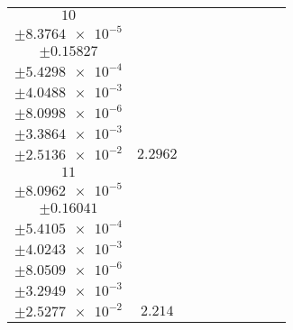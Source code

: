 \documentclass[8pt]{article}
\begin{document}
\begin{longtable}[l]{c c c c c c c c c}
$\num{10}$ & \begin{tabular}[c]{@{}c@{}}$\num{3.0635e-2}$ \\ $\pm\num{8.3764e-5}$\end{tabular} & \begin{tabular}[c]{@{}c@{}}$\num{0.35193}$ \\ $\pm\num{0.15827}$\end{tabular} & \begin{tabular}[c]{@{}c@{}}$\num{-1.9913}$ \\ $\pm\num{5.4298e-4}$\end{tabular} & \begin{tabular}[c]{@{}c@{}}$\num{1.4364e+3}$ \\ $\pm\num{4.0488e-3}$\end{tabular} & \begin{tabular}[c]{@{}c@{}}$\num{2.8736}$ \\ $\pm\num{8.0998e-6}$\end{tabular} & \begin{tabular}[c]{@{}c@{}}$\num{1.1702}$ \\ $\pm\num{3.3864e-3}$\end{tabular} & \begin{tabular}[c]{@{}c@{}}$\num{4.2518}$ \\ $\pm\num{2.5136e-2}$\end{tabular} & $\num{2.2962}$\\
$\num{11}$ & \begin{tabular}[c]{@{}c@{}}$\num{2.9378e-2}$ \\ $\pm\num{8.0962e-5}$\end{tabular} & \begin{tabular}[c]{@{}c@{}}$\num{0.42961}$ \\ $\pm\num{0.16041}$\end{tabular} & \begin{tabular}[c]{@{}c@{}}$\num{1.9881}$ \\ $\pm\num{5.4105e-4}$\end{tabular} & \begin{tabular}[c]{@{}c@{}}$\num{1.4404e+3}$ \\ $\pm\num{4.0243e-3}$\end{tabular} & \begin{tabular}[c]{@{}c@{}}$\num{2.8816}$ \\ $\pm\num{8.0509e-6}$\end{tabular} & \begin{tabular}[c]{@{}c@{}}$\num{1.1355}$ \\ $\pm\num{3.2949e-3}$\end{tabular} & \begin{tabular}[c]{@{}c@{}}$\num{4.0183}$ \\ $\pm\num{2.5277e-2}$\end{tabular} & $\num{2.214}$\\

\end{longtable}
\end{document}
